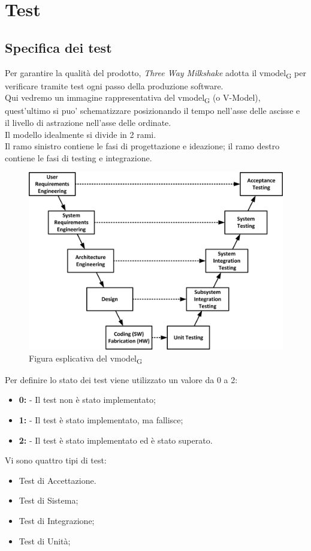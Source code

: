 \section{Test}

\subsection{Specifica dei test}

Per garantire la qualità del prodotto, \textit{Three Way Milkshake} adotta il \gls{vmodel}\textsubscript{G} per verificare tramite test ogni passo della produzione software.\\Qui vedremo un immagine rappresentativa del \gls{vmodel}\textsubscript{G} (o V-Model), quest'ultimo si puo' schematizzare posizionando il tempo nell'asse delle ascisse e il livello di astrazione nell'asse delle ordinate.\\Il modello idealmente si divide in 2 rami.\\Il ramo sinistro contiene le fasi di progettazione e ideazione; il ramo destro contiene le fasi di testing e integrazione.
\begin{figure}[h!]
	\centering
	\includegraphics[scale=0.6]{res/images/v_model.jpg}
	\caption{Figura esplicativa del \gls{vmodel}\textsubscript{G}}
\end{figure}

Per definire lo stato dei test viene utilizzato un valore da 0 a 2:
\begin{itemize}
	\item \textbf{0:} - Il test non è stato implementato;
	\item \textbf{1:} - Il test è stato implementato, ma fallisce;
	\item \textbf{2:} - Il test è stato implementato ed è stato superato.
\end{itemize}
Vi sono quattro tipi di test:
\begin{itemize}
	\item Test di Accettazione.
	\item Test di Sistema;
	\item Test di Integrazione;
	\item Test di Unità;
\end{itemize}

